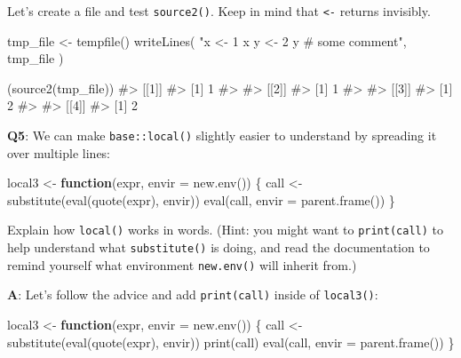 \documentclass[
]{krantz}
\makeatletter
\newenvironment{Shaded}{\begin{snugshade}}{\end{snugshade}}
\newcommand{\CommentTok}[1]{\textcolor[rgb]{0.56,0.35,0.01}{\textit{#1}}}
\newcommand{\ControlFlowTok}[1]{\textcolor[rgb]{0.13,0.29,0.53}{\textbf{#1}}}
\newcommand{\DataTypeTok}[1]{\textcolor[rgb]{0.13,0.29,0.53}{#1}}
\newcommand{\KeywordTok}[1]{\textcolor[rgb]{0.13,0.29,0.53}{\textbf{#1}}}
\newcommand{\NormalTok}[1]{#1}
\newcommand{\StringTok}[1]{\textcolor[rgb]{0.31,0.60,0.02}{#1}}
\newenvironment{kframe}{%
\medskip{}
\setlength{\fboxsep}{.8em}
 \def\at@end@of@kframe{}%
 \ifinner\ifhmode%
  \def\at@end@of@kframe{\end{minipage}}%
  \begin{minipage}{\columnwidth}%
 \fi\fi%
 \def\FrameCommand##1{\hskip\@totalleftmargin \hskip-\fboxsep
 \colorbox{shadecolor}{##1}\hskip-\fboxsep
     \hskip-\linewidth \hskip-\@totalleftmargin \hskip\columnwidth}%
 \MakeFramed {\advance\hsize-\width
   \@totalleftmargin\z@ \linewidth\hsize
   \@setminipage}}%
 {\par\unskip\endMakeFramed%
 \at@end@of@kframe}
\renewenvironment{Shaded}{\begin{kframe}}{\end{kframe}}
\renewcommand{\KeywordTok} [1]{\textcolor[rgb]{0.00,0.44,0.13}{{#1}}}
\renewcommand{\DataTypeTok}[1]{\textcolor[rgb]{0.56,0.13,0.00}{{#1}}}
\renewcommand{\StringTok}  [1]{\textcolor[rgb]{0.25,0.44,0.63}{{#1}}}
\renewcommand{\CommentTok} [1]{\textcolor[rgb]{0.38,0.63,0.69}{{#1}}}
\renewcommand{\NormalTok}  [1]{{#1}}
\makeatother
\begin{document}
Let's create a file and test \texttt{source2()}. Keep in mind that \texttt{\textless{}-} returns invisibly.

\begin{Shaded}
\begin{Highlighting}[]
\NormalTok{tmp_file <-}\StringTok{ }\KeywordTok{tempfile}\NormalTok{()}
\KeywordTok{writeLines}\NormalTok{(}
  \StringTok{"x <- 1}
\StringTok{       x}
\StringTok{       y <- 2}
\StringTok{       y  # some comment"}\NormalTok{,}
\NormalTok{  tmp_file}
\NormalTok{)}

\NormalTok{(}\KeywordTok{source2}\NormalTok{(tmp_file))}
\CommentTok{#> [[1]]}
\CommentTok{#> [1] 1}
\CommentTok{#> }
\CommentTok{#> [[2]]}
\CommentTok{#> [1] 1}
\CommentTok{#> }
\CommentTok{#> [[3]]}
\CommentTok{#> [1] 2}
\CommentTok{#> }
\CommentTok{#> [[4]]}
\CommentTok{#> [1] 2}
\end{Highlighting}
\end{Shaded}

\textbf{{Q5}}: We can make \texttt{base::local()} slightly easier to understand by spreading it over multiple lines:

\begin{Shaded}
\begin{Highlighting}[]
\NormalTok{local3 <-}\StringTok{ }\ControlFlowTok{function}\NormalTok{(expr, }\DataTypeTok{envir =} \KeywordTok{new.env}\NormalTok{()) \{}
\NormalTok{  call <-}\StringTok{ }\KeywordTok{substitute}\NormalTok{(}\KeywordTok{eval}\NormalTok{(}\KeywordTok{quote}\NormalTok{(expr), envir))}
  \KeywordTok{eval}\NormalTok{(call, }\DataTypeTok{envir =} \KeywordTok{parent.frame}\NormalTok{())}
\NormalTok{\}}
\end{Highlighting}
\end{Shaded}

Explain how \texttt{local()} works in words. (Hint: you might want to \texttt{print(call)} to help understand what \texttt{substitute()} is doing, and read the documentation to remind yourself what environment \texttt{new.env()} will inherit from.)

\textbf{{A}}: Let's follow the advice and add \texttt{print(call)} inside of \texttt{local3()}:

\begin{Shaded}
\begin{Highlighting}[]
\NormalTok{local3 <-}\StringTok{ }\ControlFlowTok{function}\NormalTok{(expr, }\DataTypeTok{envir =} \KeywordTok{new.env}\NormalTok{()) \{}
\NormalTok{  call <-}\StringTok{ }\KeywordTok{substitute}\NormalTok{(}\KeywordTok{eval}\NormalTok{(}\KeywordTok{quote}\NormalTok{(expr), envir))}
  \KeywordTok{print}\NormalTok{(call)}
  \KeywordTok{eval}\NormalTok{(call, }\DataTypeTok{envir =} \KeywordTok{parent.frame}\NormalTok{())}
\NormalTok{\}}
\end{Highlighting}
\end{Shaded}
\end{document}
